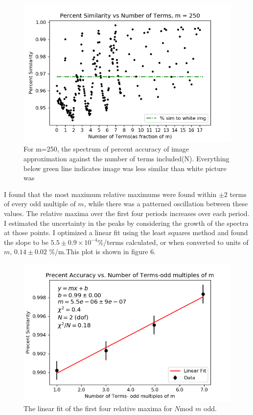 \documentclass[psamsfonts]{amsart}
\theoremstyle{definition}
\theoremstyle{remark}
\numberwithin{equation}{section}
\begin{document}
\begin{figure}[h!]
	\centering
	\includegraphics[scale=.5]{girl_250_finalplot.png}
	\caption{For m=250, the spectrum of percent accuracy of image approximation against the number of terms included(N).
	Everything below green line indicates image was less similar than white picture was}
\end{figure}


 I found that the most maximum relative maximums were found within $\pm 2$ terms of every odd multiple of $m$, while there was a patterned oscillation between these values. The relative maxima over the first four periods increases over each period. I estimated the uncertainty in the peaks by considering the growth of the spectra at those points. I optimized a linear fit using the least squares method and found the slope to be $5.5\pm0.9\times 10^{-4}$\%/terms calculated, or when converted to units of $m$,   $0.14 \pm 0.02$ \%/m.This plot is shown in figure 6.
 \begin{figure}[h!]
 	\centering
 	\includegraphics[scale=.4]{girl_250_firstfour.png}
 	\caption{The linear fit of the first four relative maxima for $N$mod $m$ odd.}
 \end{figure}
 
\end{document}
